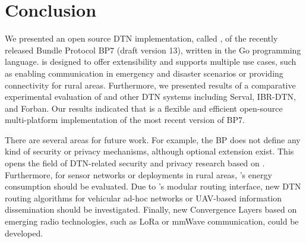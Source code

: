 \section{Conclusion}
\label{sec:conclusion}
We presented an open source DTN implementation, called \dtn, of the recently released Bundle Protocol BP7 (draft version 13), written in the Go programming language.
\dtn is designed to offer extensibility and supports multiple use cases, such as enabling communication in emergency and disaster scenarios or providing connectivity for rural areas.
Furthermore, we presented results of a comparative experimental evaluation of \dtn and other DTN systems including Serval, IBR-DTN, and Forban.
Our results indicated that \dtn is a flexible and efficient open-source multi-platform implementation of the most recent version of BP7.

There are several areas for future work.
For example, the BP does not define any kind of security or privacy mechanisms, although optional extension exist.
This opens the field of DTN-related security and privacy research based on \dtn.
Furthermore, for sensor networks or deployments in rural areas, \dtn's energy consumption should be evaluated.
Due to \dtn's modular routing interface, new DTN routing algorithms for vehicular ad-hoc networks or UAV-based information dissemination should be investigated.
Finally, new Convergence Layers based on emerging radio technologies, such as LoRa or mmWave communication, could be developed.
